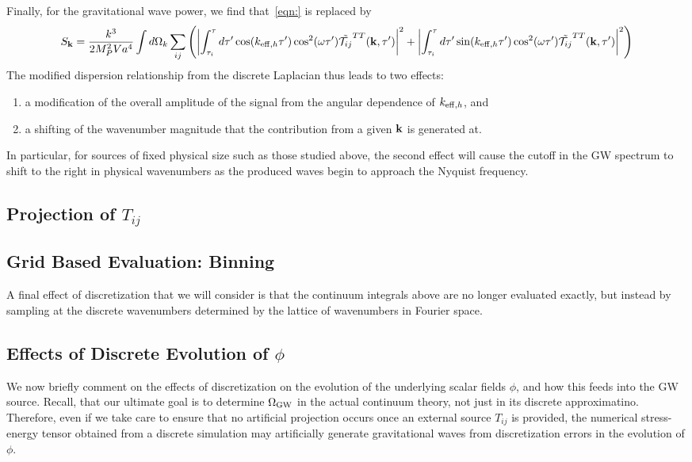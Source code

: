 \documentclass{revtex4}
\begin{document}
Finally, for the gravitational wave power, we find that~\eqref{eqn:} is replaced by
\begin{equation}
  S_{\bf k} = \frac{k^3}{2M_P^2Va^4}\int d\Omega_k\sum_{ij}\left(\left|\int_{\tau_i}^\tau d\tau'\cos(k_{{\rm eff},h}\tau')\cos^2(\omega \tau')\tilde{\mathcal{T}_{ij}}^{TT}({\bf k},\tau')\right|^2 + \left|\int_{\tau_i}^\tau d\tau'\sin(k_{{\rm eff},h}\tau')\cos^2(\omega \tau')\tilde{\mathcal{T}_{ij}}^{TT}({\bf k},\tau')\right|^2 \right)
\end{equation}
The modified dispersion relationship from the discrete Laplacian thus leads to two effects:
\begin{enumerate}
\item a modification of the overall amplitude of the signal from the angular dependence of $k_{{\rm eff},h}$, and
\item a shifting of the wavenumber magnitude that the contribution from a given ${\bf k}$ is generated at.
\end{enumerate}
In particular, for sources of fixed physical size such as those studied above, the second effect will cause the cutoff in the GW spectrum to shift to the right in physical wavenumbers as the produced waves begin to approach the Nyquist frequency.

\subsection{Projection of $T_{ij}$}

\subsection{Grid Based Evaluation: Binning}
A final effect of discretization that we will consider is that the continuum integrals above are no longer evaluated exactly, but instead by sampling at the discrete wavenumbers determined by the lattice of wavenumbers in Fourier space.

\subsection{Effects of Discrete Evolution of $\phi$}
We now briefly comment on the effects of discretization on the evolution of the underlying scalar fields $\phi$, and how this feeds into the GW source.
Recall, that our ultimate goal is to determine $\Omega_{\rm GW}$ in the actual continuum theory, not just in its discrete approximatino.
Therefore, even if we take care to ensure that no artificial projection occurs once an external source $T_{ij}$ is provided, the numerical stress-energy tensor obtained from a discrete simulation may artificially generate gravitational waves from discretization errors in the evolution of $\phi$.
\end{document}
